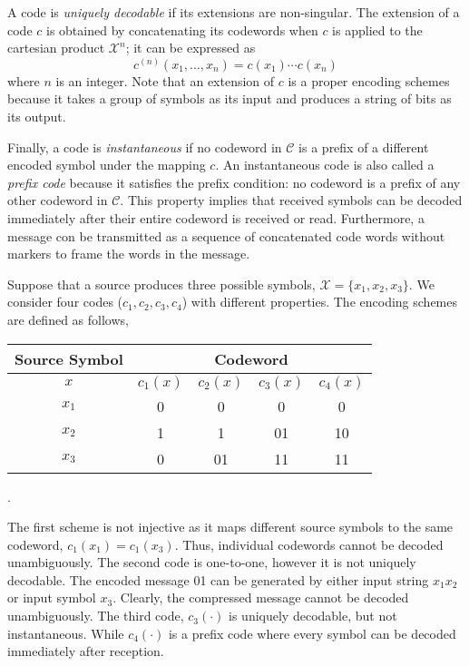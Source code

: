 A code is \emph{uniquely decodable} if its extensions are non-singular.
The extension of a code $c$ is obtained by concatenating its codewords when $c$ is applied to the cartesian product $\mathcal{X}^n$; it can be expressed as
\begin{equation*}
c^{(n)} (x_1, \ldots, x_n) = c(x_1) \cdots c(x_n)
\end{equation*}
where $n$ is an integer.
Note that an extension of $c$ is a proper encoding schemes because it takes a group of symbols as its input and produces a string of bits as its output.

Finally, a code is \emph{instantaneous} if no codeword in $\mathcal{C}$ is a prefix of a different encoded symbol under the mapping $c$.
An instantaneous code is also called a \emph{prefix code} because it satisfies the prefix condition: no codeword is a prefix of any other codeword in $\mathcal{C}$.
This property implies that received symbols can be decoded immediately after their entire codeword is received or read.
Furthermore, a message con be transmitted as a sequence of concatenated code words without markers to frame the words in the message.

\begin{example}
Suppose that a source produces three possible symbols, $\mathcal{X} = \{ x_1, x_2, x_3 \}$.
We consider four codes ($c_1, c_2, c_3, c_4$) with different properties.
The encoding schemes are defined as follows,
\begin{center}
\begin{tabular}{|c|c|c|c|c|}
\hline
Source Symbol & \multicolumn{4}{c|}{Codeword} \\
\hline
$x$ & $c_1(x)$ & $c_2(x)$ & $c_3(x)$ & $c_4(x)$ \\
\hline
$x_1$ & 0 & 0 & 0 & 0 \\
$x_2$ & 1 & 1 & 01 & 10 \\
$x_3$ & 0 & 01 & 11 & 11 \\
\hline
\end{tabular} .
\end{center}
The first scheme is not injective as it maps different source symbols to the same codeword, $c_1(x_1) = c_1(x_3)$.
Thus, individual codewords cannot be decoded unambiguously.
The second code is one-to-one, however it is not uniquely decodable.
The encoded message 01 can be generated by either input string $x_1 x_2$ or input symbol $x_3$.
Clearly, the compressed message cannot be decoded unambiguously.
The third code, $c_3(\cdot)$ is uniquely decodable, but not instantaneous.
While $c_4(\cdot)$ is a prefix code where every symbol can be decoded immediately after reception.
\end{example}


